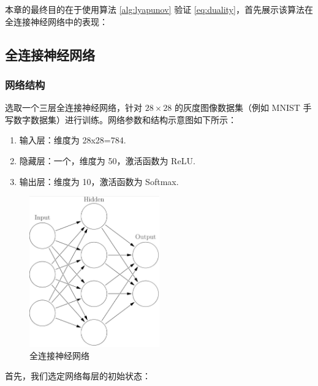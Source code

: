 本章的最终目的在于使用算法 \ref{alg:lyapunov} 验证 \ref{eq:duality}，首先展示该算法在全连接神经网络中的表现：

\subsection{全连接神经网络}

\subsubsection{网络结构}

选取一个三层全连接神经网络，针对 $28\times 28$ 的灰度图像数据集（例如 MNIST 手写数字数据集）进行训练。网络参数和结构示意图如下所示：

\begin{enumerate}
  \item 输入层：维度为 28x28=784.
  \item 隐藏层：一个，维度为 50，激活函数为 ReLU.
  \item 输出层：维度为 10，激活函数为 Softmax.
\end{enumerate}

\begin{figure}[htbp]
  \centering
  \includegraphics[width=0.5\textwidth]{figures/nn.jpeg}
  \caption{全连接神经网络}
  \label{fig:example}
\end{figure}

首先，我们选定网络每层的初始状态：

